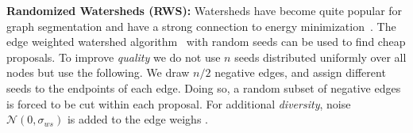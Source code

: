 \documentclass[10pt,twocolumn,letterpaper]{article}
\theoremstyle{definition}
\begin{document}
%

\noindent \textbf{Randomized Watersheds (RWS):}
Watersheds have become quite popular for
graph segmentation and have a strong connection
to energy minimization~\cite{couprie_2011}.
%
The edge weighted watershed algorithm~\cite{meyer_2013}
with random seeds can be used to find
cheap proposals.
To improve \emph{quality} we do not use $n$ seeds distributed uniformly
over all nodes but use the following.
%
We draw $n/2$ negative edges, and assign different seeds to the endpoints
of each edge.
Doing so, a random subset of negative edges is forced
to be cut within each proposal.
For additional \emph{diversity}, noise $\mathcal{N} (0, \sigma_{ws})$
is added to the edge weighs \cite{straehle_2012}.

%


\end{document}
